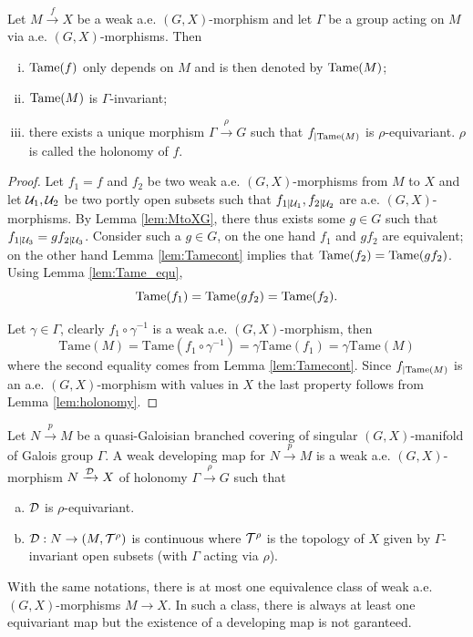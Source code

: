 \begin{prop} Let $M\xrightarrow{f} X$ be a weak a.e. $(G,X)$-morphism
and let  $\Gamma$ be a group acting on $M$ via a.e. $(G,X)$-morphisms.
Then
\begin{enumerate}[(i)]
 \item $\mathrm{Tame}(f)$ only depends on $M$ and is then denoted by $\mathrm{Tame}(M)$;
 \item $\mathrm{Tame}(M)$ is $\Gamma$-invariant;
 \item there exists a unique morphism $\Gamma \xrightarrow{\rho} G$ such that $f_{|\mathrm{Tame}(M)}$ is $\rho$-equivariant. $\rho$ is called the holonomy of $f$.
\end{enumerate}
\end{prop}
\begin{proof}

Let $f_1=f$ and $f_2$ be two weak a.e. $(G,X)$-morphisms from $M$ to $X$ and let $\mathcal{U}_1,\mathcal{U}_2$ be two portly open subsets such that $f_{1|\mathcal{U}_1},f_{2|\mathcal{U}_2}$ are a.e. $(G,X)$-morphisms. 
  By Lemma \ref{lem:MtoXG}, there thus exists some $g\in G$ such that $f_{1|\mathcal{U}_3} = gf_{2|\mathcal{U}_3}$. Consider such a $g \in G$, on the one hand  $f_{1}$ and $gf_{2}$ are equivalent; on the other hand Lemma \ref{lem:Tamecont} implies that $\mathrm{Tame}(f_2)=\mathrm{Tame}(gf_2)$. Using  Lemma \ref{lem:Tame_equ}, $$\mathrm{Tame}(f_1)=\mathrm{Tame}(gf_2)=\mathrm{Tame}(f_2).$$

Let $\gamma \in \Gamma$, clearly $f_1\circ \gamma^{-1} $ is a weak a.e. $(G,X)$-morphism, then 
$$\mathrm{Tame}(M)=\mathrm{Tame}(f_1\circ \gamma^{-1}) =  \gamma \mathrm{Tame}(f_1)=\gamma \mathrm{Tame}(M)$$ 
where the second equality comes from Lemma \ref{lem:Tamecont}.
Since  $f_{|\mathrm{Tame}(M)}$ is an a.e. $(G,X)$-morphism with values in $X$ the last property follows from Lemma \ref{lem:holonomy}.
\end{proof}



\begin{defi} \label{defi:weakdevmap}
Let $N\xrightarrow{p} M$ be a quasi-Galoisian branched covering of singular $(G,X)$-manifold of Galois group $\Gamma$. 
A weak developing map for  $N\xrightarrow{p} M$ is a weak a.e. $(G,X)$-morphism $N\xrightarrow{\mathcal{D}} X$ of holonomy $\Gamma \xrightarrow{\rho} G$ such that
\begin{enumerate}[(a)]
 \item $\mathcal{D}$ is $\rho$-equivariant.
 \item $\mathcal{D} : N\rightarrow (M,\mathcal{T}^\rho)$ is continuous  where $\mathcal{T}^\rho$ is the topology of $X$ given by $\Gamma$-invariant open subsets (with $\Gamma$ acting via $\rho$).
\end{enumerate}
\end{defi}
\begin{rem} With the same notations, there is at most one equivalence class of weak a.e. $(G,X)$-morphisms $M\rightarrow X$. In such a class, there is always at least one equivariant map but the existence of a developing map is not garanteed. 
\end{rem}

